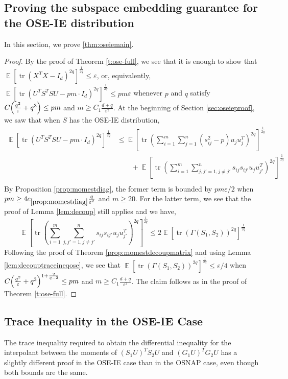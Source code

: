 \documentclass[11pt]{amsart}
\numberwithin{equation}{section}
\numberwithin{equation}{section}
\DeclareMathOperator{\E}{\mathbb{E}}
\DeclareMathOperator*{\tr}{tr}
\DeclarePairedDelimiter{\paren}{(}{)}
\theoremstyle{remark}
\theoremstyle{definition}
\begin{document}
\subsection{Proving the subspace embedding guarantee for the OSE-IE distribution} \label{subsec:oseiemain}

In this section, we prove \ref{thm:oseiemain}.

\oseiemainthm*

\begin{proof}
    By the proof of Theorem \ref{t:ose-full}, we see that it is enough to show that $\E[\tr(X^TX - I_d)^{2q}]^\frac{1}{2q} \leq  \varepsilon$, or, equivalently, $ \E [ \tr (U^TS^TSU - pm\cdot I_d)^{2q} ]^\frac{1}{2q} \le pm \varepsilon$ whenever $p$ and $q$ satisfy $ C\paren*{\frac{q^2}{\varepsilon} + q^3} \le pm$ and $m \ge C_1\frac{d+q}{\varepsilon^2}$.
    At the beginning of Section \ref{sec:oseieproof}, we saw that when $S$ has the OSE-IE distribution, 
    \begin{align*}
    \E [ \tr (U^TS^TSU - pm\cdot I_d)^{2q} ]^\frac{1}{2q} &\le \E \left[ \tr \left( \sum_{i=1}^m \sum_{j =1}^n (s_{ij}^2 - p)u_j u_{j}^T \right)^{2q} \right]^\frac{1}{2q} \\
    & \qquad + \E \left[ \tr \left( \sum_{i=1}^m \sum_{j,j' =1, j \neq j'}^n s_{ij}s_{ij'} u_j u_{j'}^T \right)^{2q} \right]^\frac{1}{2q} \\
    \end{align*}
    By Proposition \ref{prop:momestdiag}, the former term is bounded by $pm\varepsilon/2$ when $pm \geq 4c_{\ref*{prop:momestdiag}} \frac{q}{\varepsilon^2} $ and $m \ge 20$. For the latter term, we see that the proof of Lemma \ref{lem:decoup}  still applies and we have, 
    \[ \E \left[ \tr \left( \sum_{i=1}^m \sum_{j,j' =1, j \neq j'}^n s_{ij}s_{ij'} u_j u_{j'}^T \right)^{2q} \right]^\frac{1}{2q} \le 2 \E[\tr(\Gamma(S_1,S_2))^{2q}]^\frac{1}{2q} \]
    Following the proof of Theorem \ref{prop:momestdecoupmatrix} and using Lemma \ref{lem:decouptraceineqose}, we see that $\E[\tr(\Gamma(S_1,S_2))^{2q}]^\frac{1}{2q} \le \varepsilon/4$ when $ C\paren*{\frac{q^2}{\varepsilon} + q^3}^{1+\frac{2}{q-2}} \le pm$ and $m \ge C_1\frac{d+q}{\varepsilon^2}$. The claim follows as in the proof of Theorem \ref{t:ose-full}. 
\end{proof}





\subsection{Trace Inequality in the OSE-IE Case}
The trace inequality required to obtain the differential inequality for the interpolant between the moments of $(S_1U)^TS_2U$ and $(G_1U)^TG_2U$ has a slightly different proof in the OSE-IE case than in the OSNAP case, even though both bounds are the same.
\end{document}
